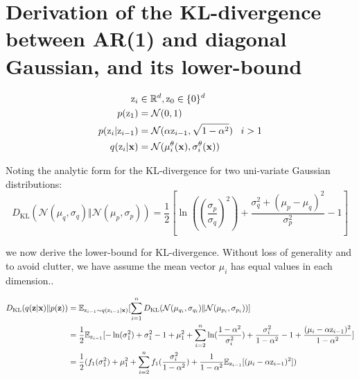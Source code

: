 \documentclass{article} \usepackage{iclr2019_conference,times}
\def\rz{{\textnormal{z}}}
\def\rvx{{\mathbf{x}}}
\def\rvz{{\mathbf{z}}}
\newcommand{\E}{\mathbb{E}}
\newcommand{\KL}{D_{\mathrm{KL}}}
\begin{document}
\section{Derivation of the KL-divergence between AR(1) and diagonal Gaussian, and its lower-bound}
\begin{equation*}
\begin{aligned}
\rz_i & \in \mathbb{R}^d, \rz_0 \in \{0\}^d \\
p(\rz_1) & = \mathcal{N}(0, 1) \\
p(\rz_i|\rz_{i-1}) & = \mathcal{N}(\alpha \rz_{i-1}, \sqrt{1 - \alpha^2}) \,\,\,\,\, i > 1\\
q(\rz_i|\rvx) & = \mathcal{N}(\mu_i^\theta(\rvx), \sigma_i^\theta(\rvx)) \\
\end{aligned}
\end{equation*}

Noting the analytic form for the KL-divergence for two uni-variate Gaussian distributions:
\begin{equation}\label{eq:normalkl}
\KL(\mathcal{N}(\mu_q, \sigma_q) \Vert \mathcal{N}(\mu_p, \sigma_p)) = \frac{1}{2}[\ln((\frac{\sigma_p}{\sigma_q})^2) + \frac{\sigma_q^2 + (\mu_p - \mu_q)^2}{\sigma_p^2} - 1]
\end{equation}

we now derive the lower-bound for KL-divergence.  Without loss of generality and to avoid clutter, we have assume the mean vector $\mu_i$ has equal values in each dimension.\cite{Newell81}.


\begin{equation*}
\begin{aligned}    
\KL(q(\rvz|\rvx) \Vert p(\rvz)) & = \E_{\rz_{i-1}\sim q(\rz_{i-1}|\rvx)} [\sum\limits_{i=1}^{n} \KL(\mathcal{N}(\mu_{q_i}, \sigma_{q_i}) \Vert \mathcal{N}(\mu_{p_i}, \sigma_{p_i}))]  \\
& = \frac{1}{2}\E_{\rz_{i-1}} [
            -\ln(\sigma_1^2) + \sigma_1^2 -1 + \mu_1^2
            + \sum_{i=2}^n \ln(\frac{1 - \alpha^2}{\sigma_i^2}) + \frac{\sigma_i^2}{1-\alpha^2} - 1
            + \frac{(\mu_i - \alpha \rz_{i-1})^2}{1 - \alpha^2}] \\
& = \frac{1}{2}(f_1(\sigma_1^2) + \mu_1^2
                + \sum_{i=2}^n f_1(\frac{\sigma_i^2}{1-\alpha^2}) + \frac{1}{1-\alpha^2}\E_{\rz_{i-1}}[(\mu_i - \alpha \rz_{i-1})^2])\\
\end{aligned}
\end{equation*}
\end{document}

